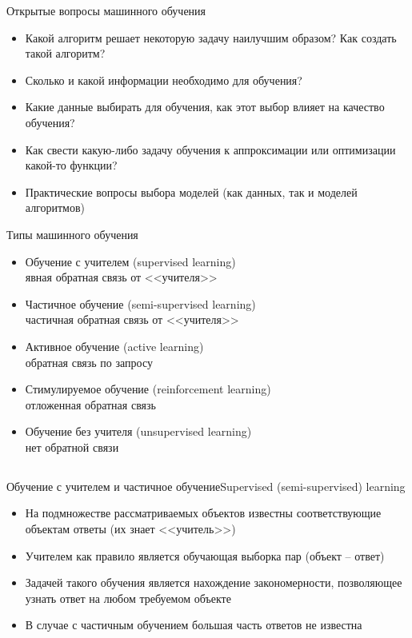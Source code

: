 \documentclass[compress,red,unicode]{beamer}
\begin{document}
\begin{frame}{Открытые вопросы машинного обучения}
\begin{itemize}
	\item Какой алгоритм решает некоторую задачу наилучшим образом? Как создать такой алгоритм?
	\item Сколько и какой информации необходимо для обучения?
	\item Какие данные выбирать для обучения, как этот выбор влияет на качество обучения? 
	\item Как свести какую-либо задачу обучения к аппроксимации или оптимизации какой-то функции?
	\item Практические вопросы выбора моделей (как данных, так и моделей алгоритмов)
\end{itemize}
\end{frame}


\begin{frame}{Типы машинного обучения}
\begin{itemize}
	\item Обучение с учителем (supervised learning)\\
	{\color{green!90!red!80!black} явная обратная связь от <<учителя>>}
	\item Частичное обучение (semi-supervised learning)\\
	{\color{green!70!red!80!black} частичная обратная связь от <<учителя>>}
	\item Активное обучение (active learning)\\
	{\color{green!50!red!80!black} обратная связь по запросу}
	\item Стимулируемое обучение (reinforcement learning)\\
	{\color{green!30!red!80!black} отложенная обратная связь}
	\item Обучение без учителя (unsupervised learning)\\
	{\color{green!10!red!80!black} нет обратной связи}
\end{itemize}
\end{frame}



\subsection{}
\begin{frame}{Обучение с учителем и частичное обучение}{Supervised (semi-supervised) learning}
\begin{itemize}
\item На подмножестве рассматриваемых объектов известны соответствующие объектам ответы (их знает <<учитель>>)
\item Учителем как правило является обучающая выборка пар (объект -- ответ)
\item Задачей такого обучения является нахождение закономерности, позволяющее узнать ответ на любом требуемом объекте
\item В случае с частичным обучением большая часть ответов не известна

\end{itemize}
\end{frame}
\end{document}
